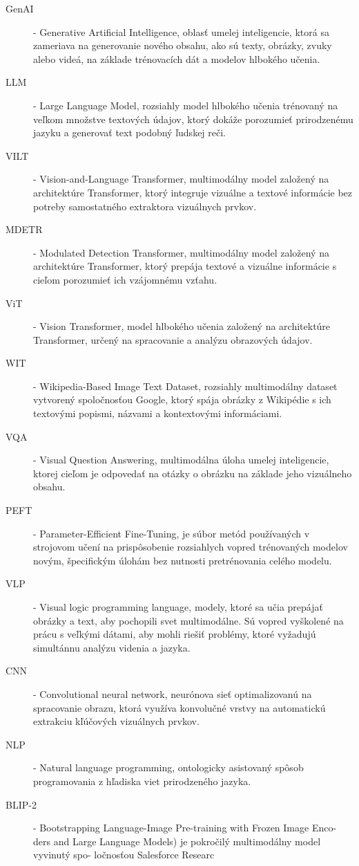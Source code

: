 \documentclass[]{tukediphc}
\begin{document}
\begin{description}
\item[GenAI] - Generative Artificial Intelligence, oblasť umelej inteligencie, ktorá sa zameriava na generovanie nového obsahu, ako sú texty, obrázky, zvuky alebo videá, na základe trénovacích dát a modelov hlbokého učenia.
\item[LLM] - Large Language Model, rozsiahly model hlbokého učenia trénovaný na veľkom množstve textových údajov, ktorý dokáže porozumieť prirodzenému jazyku a generovať text podobný ľudskej reči.
\item[VILT] - Vision-and-Language Transformer, multimodálny model založený na architektúre Transformer, ktorý integruje vizuálne a textové informácie bez potreby samostatného extraktora vizuálnych prvkov.
\item[MDETR] - Modulated Detection Transformer, multimodálny model založený na architektúre Transformer, ktorý prepája textové a vizuálne informácie s cieľom porozumieť ich vzájomnému vzťahu.
\item[ViT] - Vision Transformer, model hlbokého učenia založený na architektúre Transformer, určený na spracovanie a analýzu obrazových údajov.
\item[WIT] - Wikipedia-Based Image Text Dataset, rozsiahly multimodálny dataset vytvorený spoločnosťou Google, ktorý spája obrázky z Wikipédie s ich textovými popismi, názvami a kontextovými informáciami.
\item[VQA] - Visual Question Answering, multimodálna úloha umelej inteligencie, ktorej cieľom je odpovedať na otázky o obrázku na základe jeho vizuálneho obsahu. 
\item[PEFT] - Parameter-Efficient Fine-Tuning, je súbor metód používaných v strojovom učení na prispôsobenie rozsiahlych vopred trénovaných modelov novým, špecifickým úlohám bez nutnosti pretrénovania celého modelu.
\item[VLP] - Visual logic programming language, modely, ktoré sa učia prepájať obrázky a text, aby pochopili svet multimodálne. Sú vopred vyškolené na prácu s veľkými dátami, aby mohli riešiť problémy, ktoré vyžadujú simultánnu analýzu videnia a jazyka.
\item[CNN] - Convolutional neural network, neurónova sieť optimalizovanú na spracovanie obrazu, ktorá využíva konvolučné vrstvy na automatickú extrakciu kľúčových vizuálnych prvkov.
\item[NLP] - Natural language programming, ontologicky asistovaný spôsob programovania z hľadiska viet prirodzeného jazyka.
\item[BLIP-2] - Bootstrapping Language-Image Pre-training with Frozen Image Enco-
ders and Large Language Models) je pokročilý multimodálny model vyvinutý spo-
ločnosťou Salesforce Researc
\end{description}
\end{document}
